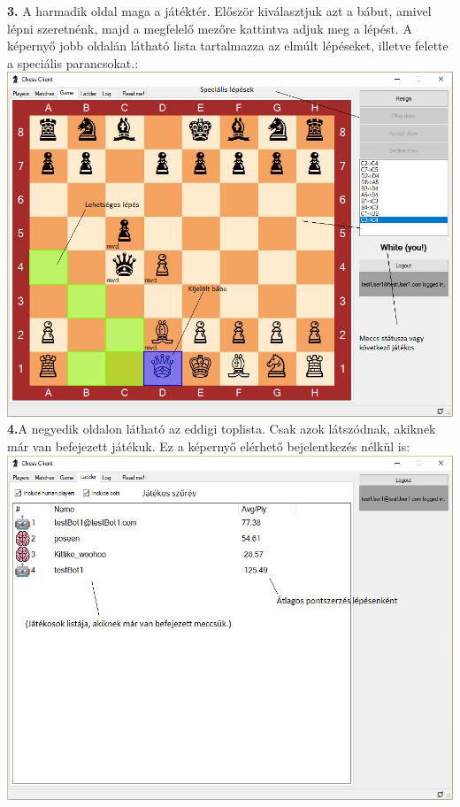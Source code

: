 \documentclass[twoside, a4paper, 12pt]{book}
\begin{document}
\newpage
\noindent \textbf{3.} A harmadik oldal maga a játéktér. Először kiválasztjuk azt a bábut, amivel lépni szeretnénk, majd a megfelelő mezőre kattintva adjuk meg a lépést. A képernyő jobb oldalán látható lista tartalmazza az elmúlt lépéseket, illetve felette a speciális parancsokat.: \\
\includegraphics[width=1.0\textwidth]{img/chessClient_3.png} \\
\newpage
\noindent \textbf{4.}A negyedik oldalon látható az eddigi toplista. Csak azok látszódnak, akiknek már van befejezett játékuk. Ez a képernyő elérhető bejelentkezés nélkül is: \\
\includegraphics[width=1.0\textwidth]{img/chessClient_4.png} \\
\end{document}
